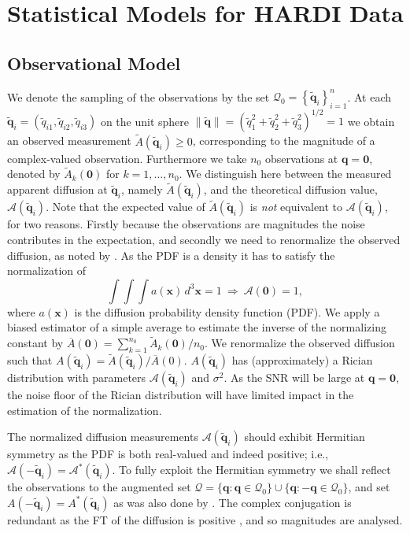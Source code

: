 \documentclass[dvips,aoas,preprint]{imsart}
\numberwithin{equation}{section}
\theoremstyle{plain}
\newcommand{\bq}{\mathbf{q}}
\newcommand{\q}{\mathbf{q}}
\newcommand{\tbq}{\tilde{\bq}}
\newcommand{\x}{\mathbf{x}}
\newcommand{\cA}{\mathcal{A}}
\newcommand{\cQ}{\mathcal{Q}}
\newcommand{\bld}[1]{\mathbf{#1}}
\newcommand{\wt}[1]{\widetilde{#1}}
\newcommand{\ol}[1]{\overline{#1}}
\begin{document}
\section{Statistical Models for HARDI Data}

\subsection{Observational Model}

We denote the sampling of the observations by the set
$\cQ_0=\left\{\tbq_i\right\}_{i=1}^n$.  At each
$\tbq_i=(\tilde{q}_{i1},\tilde{q}_{i2},\tilde{q}_{i3})$ on the unit
sphere
$\|\tbq\|=(\tilde{q}_{1}^2+\tilde{q}_{2}^2+\tilde{q}_{3}^2)^{1/2}=1$
we obtain an observed measurement $\wt{A}(\tbq_i)\ge0$, corresponding
to the magnitude of a complex-valued observation.  Furthermore we take
$n_0$ observations at $\q=\bld{0}$, denoted by $\wt{A}_k(\bld{0})$ for
$k=1,\dots,n_0$.  We distinguish here between the measured apparent
diffusion at $\tbq_i$, namely $\wt{A}(\tbq_i)$, and the theoretical
diffusion value, $\cA(\tbq_i)$. Note that the expected value of
$\wt{A}(\tbq_i)$ is {\em not} equivalent to $\cA(\tbq_i)$, for two
reasons. Firstly because the observations are magnitudes the noise
contributes in the expectation, and secondly we need to renormalize
the observed diffusion, as noted by \citet{Alexander2005}.  As the PDF
is a density it has to satisfy the normalization of
\begin{equation}
  \int \int \int a(\x) \, d^3\x = 1 ~ \Rightarrow ~ \cA(\bld{0}) = 1,
\end{equation}
where $a(\x)$ is the diffusion probability density function (PDF).  We
apply a biased estimator of a simple average to estimate the inverse
of the normalizing constant by
$\ol{A}(\bld{0})=\sum_{k=1}^{n_0}\wt{A}_k(\bld{0})/n_0$.  We
renormalize the observed diffusion such that
$A(\tbq_i)=\wt{A}(\tbq_i)/\ol{A}(0)$.  $A(\tbq_i)$ has (approximately)
a Rician distribution with parameters $\cA(\tbq_i)$ and $\sigma^2$.
As the SNR will be large at $\q=\bld{0}$, the noise floor of the
Rician distribution will have limited impact in the estimation of the
normalization.

The normalized diffusion measurements $\cA(\tbq_i)$ should exhibit
Hermitian symmetry as the PDF is both real-valued and indeed positive;
i.e., $\cA(-\tbq_i)=\cA^*(\tbq_i)$.  To fully exploit the Hermitian
symmetry we shall reflect the observations to the augmented set
$\cQ=\{\q:\q\in\cQ_0\}\cup\{\q:-\q\in\cQ_0\}$, and set
$A(-\tbq_i)=A^*(\tbq_i)$ as was also done by \citet{Jansons}.  The
complex conjugation is redundant as the FT of the diffusion is
positive \citep{Wedeen05}, and so magnitudes are analysed.
\end{document}
